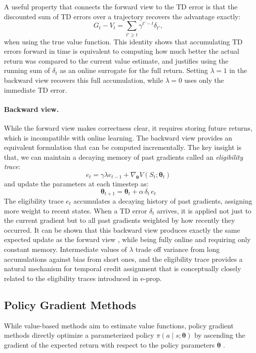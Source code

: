 A useful property that connects the forward view to the TD error is that
the discounted sum of TD errors over a trajectory recovers the advantage
exactly:
\begin{equation} \label{eq:td_return_identity}
    G_t - V_t = \sum_{t' \geq t} \gamma^{t'-t} \delta_{t'},
\end{equation}
when using the true value function. This identity shows that accumulating
TD errors forward in time is equivalent to computing how much better the
actual return was compared to the current value estimate, and justifies
using the running sum of $\delta_t$ as an online surrogate for the full
return. Setting $\lambda = 1$ in the backward view recovers this full
accumulation, while $\lambda = 0$ uses only the immediate TD error.

\paragraph{Backward view.}
While the forward view makes correctness clear, it requires storing future
returns, which is incompatible with online learning. The backward view
provides an equivalent formulation that can be computed incrementally. The
key insight is that, we can
maintain a decaying memory of past gradients called an \emph{eligibility
trace}:
\begin{equation}
e_t = \gamma \lambda e_{t-1} + \nabla_{\boldsymbol{\theta}} V(S_t; \boldsymbol{\theta}_t)
\end{equation}
and update the parameters at each timestep as:
\begin{equation}
\boldsymbol{\theta}_{t+1} = \boldsymbol{\theta}_t + \alpha \, \delta_t \, e_t
\end{equation}
The eligibility trace $e_t$ accumulates a decaying history of past gradients,
assigning more weight to recent states. When a TD error $\delta_t$ arrives,
it is applied not just to the current gradient but to all past gradients
weighted by how recently they occurred. It can be shown that this backward
view produces exactly the same expected update as the forward view
\citep{SuttonBarto2018}, while being fully online and requiring only constant
memory. Intermediate values of $\lambda$ trade off variance from long
accumulations against bias from short ones, and the eligibility trace
provides a natural mechanism for temporal credit assignment that is
conceptually closely related to the eligibility traces introduced in e-prop.


\subsection{Policy Gradient Methods}
\label{sec:policygradient}
While value-based methods aim to estimate value functions, policy gradient
methods directly optimize a parameterized policy $\pi(a \mid s; \boldsymbol{\theta})$ by
ascending the gradient of the expected return with respect to the policy
parameters $\boldsymbol{\theta}$ \citep{Williams1992REINFORCE}.

